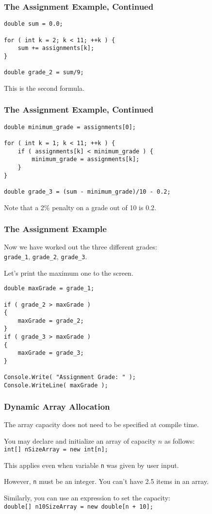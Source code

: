 \begin{frame}[fragile]
\frametitle{The Assignment Example, Continued}

\begin{verbatim}
double sum = 0.0;

for ( int k = 2; k < 11; ++k ) {
    sum += assignments[k];
}

double grade_2 = sum/9;
\end{verbatim}

This is the second formula.

\end{frame}

\begin{frame}[fragile]
\frametitle{The Assignment Example, Continued}
\begin{verbatim}
double minimum_grade = assignments[0];

for ( int k = 1; k < 11; ++k ) {
    if ( assignments[k] < minimum_grade ) {
        minimum_grade = assignments[k];
    }
}

double grade_3 = (sum - minimum_grade)/10 - 0.2;
\end{verbatim}

Note that a 2\% penalty on a grade out of 10 is 0.2.

\end{frame}

\begin{frame}[fragile]
\frametitle{The Assignment Example}
Now we have worked out the three different grades:\\
\quad \texttt{grade\_1}, \texttt{grade\_2}, \texttt{grade\_3}.

Let's print the maximum one to the screen.

\begin{verbatim}
double maxGrade = grade_1;

if ( grade_2 > maxGrade )
{
    maxGrade = grade_2;
}
if ( grade_3 > maxGrade )
{
    maxGrade = grade_3;
}

Console.Write( "Assignment Grade: " );
Console.WriteLine( maxGrade );

\end{verbatim}

\end{frame}



\begin{frame}
\frametitle{Dynamic Array Allocation}

The array capacity does not need to be specified at compile time.

You may declare and initialize an array of capacity $n$ as follows:\\
\quad \texttt{int[] nSizeArray = new int[n];}

This applies even when variable \texttt{n} was given by user input.

However, \texttt{n} must be an integer. You can't have 2.5 items in an array.

Similarly, you can use an expression to set the capacity:\\
\quad \texttt{double[] n10SizeArray = new double[n + 10];}

\end{frame}


